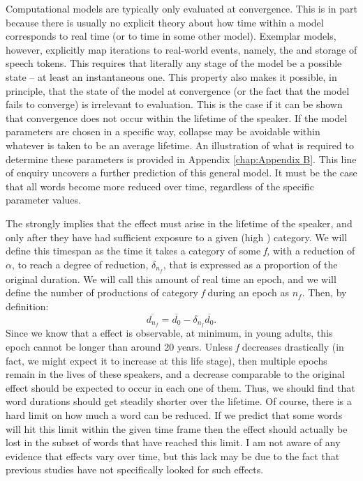 Computational models are typically only evaluated at convergence.
This is in part because there is usually no explicit theory about
how time within a model corresponds to real time (or to time in some
other model). Exemplar models, however, explicitly map iterations
to real-world events, namely, the  and storage of speech
tokens. This requires that literally any stage of the model be a possible
 state – at least an instantaneous one. This property also
makes it possible, in principle, that the state of the model at convergence
(or the fact that the model fails to converge) is irrelevant to evaluation.
This is the case if it can be shown that convergence does not occur
within the lifetime of the speaker. If the model parameters are chosen
in a specific way, collapse may be avoidable within whatever is taken
to be an average lifetime. An illustration of what is required to
determine these parameters is provided in Appendix \ref{chap:Appendix B}.
This line of enquiry uncovers a further prediction of this general
model. It must be the case that all words become more reduced over
time, regardless of the specific parameter values. 

The  strongly implies that the  effect must
arise in the lifetime of the speaker, and only after they have had
sufficient exposure to a given (high ) category. We will
define this timespan as the time it takes a category of some 
\emph{f,} with a reduction  of $\alpha$, to reach a degree of
reduction, $\delta_{n_{f}}$, that is expressed as a proportion of
the original duration. We will call this amount of real time an epoch,
and we will define the number of productions of category \emph{f}
during an epoch as $n_{f}$. Then, by definition: \[\overline{d_{n_{f}}}=\overline{d_{0}}-\delta_{n_{f}}\overline{d_{0}}\text{.}\]
Since we know that a  effect is observable, at minimum, in
young adults, this epoch cannot be longer than around 20 years. Unless
\emph{f }decreases drastically (in fact, we might expect it to increase
at this life stage), then multiple epochs remain in the lives of these
speakers, and a decrease comparable to the original  effect
should be expected to occur in each one of them. Thus, we should find
that word durations should get steadily shorter over the lifetime.
Of course, there is a hard limit on how much a word can be reduced.
If we predict that some words will hit this limit within the given
time frame then the  effect should actually be lost in the
subset of words that have reached this limit. I am not aware of any evidence
that  effects vary over time, but this lack may be due to the fact that
previous studies have not specifically looked for such effects.


